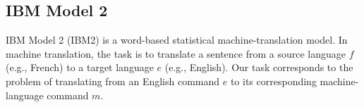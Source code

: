 \documentclass[conference]{IEEEtran}
\begin{document}

\subsection{IBM Model 2}

IBM Model 2 (IBM2) \cite{brown90,brown93} is a word-based statistical machine-translation model. In 
machine translation, the task is to translate a sentence from a source language $f$ (e.g., French) to a target language $e$ (e.g., English). Our task corresponds to the problem of translating from an English command $e$ to its corresponding machine-language command $m$. 
\end{document}
